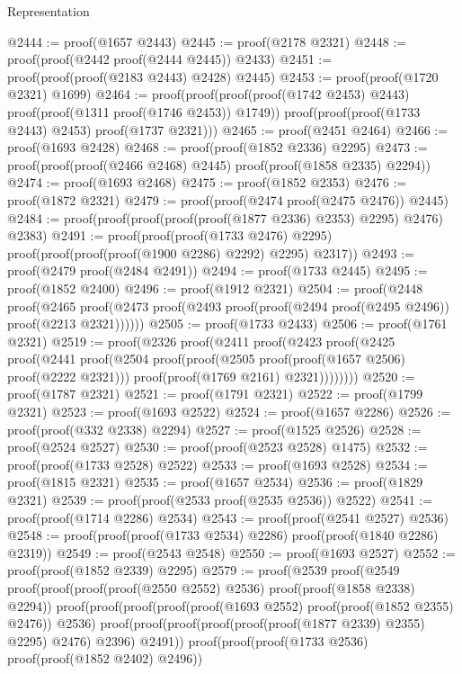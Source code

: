 \begin{lexlean}{Representation}
\begin{coremodule}
@2444 := proof(@1657 @2443)
@2445 := proof(@2178 @2321)
@2448 := proof(proof(@2442 proof(@2444 @2445)) @2433)
@2451 := proof(proof(proof(@2183 @2443) @2428) @2445)
@2453 := proof(proof(@1720 @2321) @1699)
@2464 := proof(proof(proof(proof(@1742 @2453) @2443) proof(proof(@1311 proof(@1746 @2453)) @1749))
      proof(proof(proof(@1733 @2443) @2453) proof(@1737 @2321)))
@2465 := proof(@2451 @2464)
@2466 := proof(@1693 @2428)
@2468 := proof(proof(@1852 @2336) @2295)
@2473 := proof(proof(proof(@2466 @2468) @2445) proof(proof(@1858 @2335) @2294))
@2474 := proof(@1693 @2468)
@2475 := proof(@1852 @2353)
@2476 := proof(@1872 @2321)
@2479 := proof(proof(@2474 proof(@2475 @2476)) @2445)
@2484 := proof(proof(proof(proof(proof(@1877 @2336) @2353) @2295) @2476) @2383)
@2491 := proof(proof(proof(@1733 @2476) @2295)
      proof(proof(proof(proof(@1900 @2286) @2292) @2295) @2317))
@2493 := proof(@2479 proof(@2484 @2491))
@2494 := proof(@1733 @2445)
@2495 := proof(@1852 @2400)
@2496 := proof(@1912 @2321)
@2504 := proof(@2448
      proof(@2465
          proof(@2473 proof(@2493 proof(proof(@2494 proof(@2495 @2496)) proof(@2213 @2321))))))
@2505 := proof(@1733 @2433)
@2506 := proof(@1761 @2321)
@2519 := proof(@2326
      proof(@2411
          proof(@2423
              proof(@2425
                  proof(@2441
                      proof(@2504
                          proof(proof(@2505 proof(proof(@1657 @2506) proof(@2222 @2321)))
                              proof(proof(@1769 @2161) @2321))))))))
@2520 := proof(@1787 @2321)
@2521 := proof(@1791 @2321)
@2522 := proof(@1799 @2321)
@2523 := proof(@1693 @2522)
@2524 := proof(@1657 @2286)
@2526 := proof(proof(@332 @2338) @2294)
@2527 := proof(@1525 @2526)
@2528 := proof(@2524 @2527)
@2530 := proof(proof(@2523 @2528) @1475)
@2532 := proof(proof(@1733 @2528) @2522)
@2533 := proof(@1693 @2528)
@2534 := proof(@1815 @2321)
@2535 := proof(@1657 @2534)
@2536 := proof(@1829 @2321)
@2539 := proof(proof(@2533 proof(@2535 @2536)) @2522)
@2541 := proof(proof(@1714 @2286) @2534)
@2543 := proof(proof(@2541 @2527) @2536)
@2548 := proof(proof(proof(@1733 @2534) @2286) proof(proof(@1840 @2286) @2319))
@2549 := proof(@2543 @2548)
@2550 := proof(@1693 @2527)
@2552 := proof(proof(@1852 @2339) @2295)
@2579 := proof(@2539
      proof(@2549
          proof(proof(proof(proof(@2550 @2552) @2536) proof(proof(@1858 @2338) @2294))
              proof(proof(proof(proof(proof(@1693 @2552) proof(proof(@1852 @2355) @2476)) @2536)
                    proof(proof(proof(proof(proof(proof(@1877 @2339) @2355) @2295) @2476) @2396)
                        @2491))
                  proof(proof(proof(@1733 @2536) proof(proof(@1852 @2402) @2496))

\end{coremodule}
\end{lexlean}
